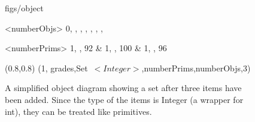 





\begin {figure}

\Draw

 {figs/object}

\Indirect \Table <numberObjs>
 {  0, , , , , , , }
  
\Indirect \Table <numberPrims>
 {  
	1, ,  92 	&
	1, ,  100	&
	1, ,  96 	
    }


\Scale (0.8,0.8)
\ObjSet(1, grades,Set~$<Integer>$,numberPrims,numberObjs,3)
    
\EndDraw

\caption {A simplified object diagram showing a set after three
items have been added. Since the type of the items is Integer (a wrapper for
int), they can be treated like primitives.}

\label {fig:setBetter}

\end {figure}


